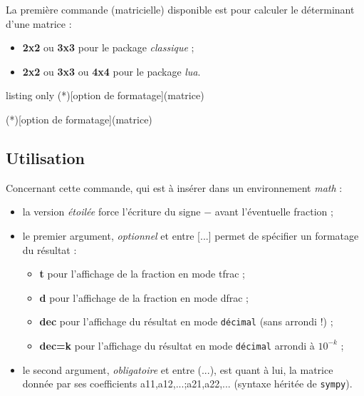 \documentclass[a4paper,11pt]{article}
\newcommand\Cle[1]{{\bfseries\sffamily\textlangle #1\textrangle}}
\begin{document}
\begin{cautionblock}
La première commande (matricielle) disponible est pour calculer le déterminant d'une matrice :

\begin{itemize}
	\item \textbf{2x2} ou \textbf{3x3} pour le package \textit{classique} ;
	\item \textbf{2x2} ou \textbf{3x3} ou \textbf{4x4} pour le package \textit{lua}.
\end{itemize}
\end{cautionblock}

\begin{PresentationCode}{listing only}
\DetMatrice(*)[option de formatage](matrice)

\DetMatriceLUA(*)[option de formatage](matrice)
\end{PresentationCode}

\subsection{Utilisation}

\begin{tipblock}
Concernant cette commande, qui est à insérer dans un environnement \textit{math} :

\begin{itemize}
	\item la version \textit{étoilée} force l'écriture du signe \og $-$ \fg{} avant l'éventuelle fraction ;
	\item le premier argument, \textit{optionnel} et entre \textsf{[...]} permet de spécifier un formatage du résultat :
	\begin{itemize}
		\item \Cle{t} pour l'affichage de la fraction en mode \textsf{tfrac} ;
		\item \Cle{d} pour l'affichage de la fraction en mode \textsf{dfrac} ;
		\item \Cle{dec} pour l'affichage du résultat en mode \texttt{décimal} (sans arrondi !) ;
		\item \Cle{dec=k} pour l'affichage du résultat en mode \texttt{décimal} arrondi à $10^{-k}$ ;
	\end{itemize}
	\item le second argument, \textit{obligatoire} et entre \textsf{(...)}, est quant à lui, la matrice donnée par ses coefficients \textsf{a11,a12,...;a21,a22,...} (syntaxe héritée de \texttt{sympy}).
\end{itemize}
\end{tipblock}
\end{document}
